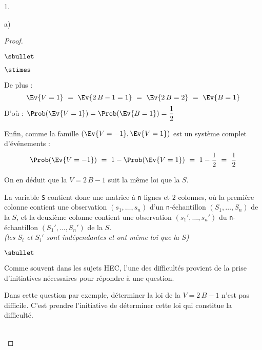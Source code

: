 \documentclass[11pt]{article}%
\begin{document}
\begin{noliste}{1.}
\begin{noliste}{a)}
\begin{proof}
\begin{noliste}{$\sbullet$}
\begin{noliste}{$\stimes$}
        \item De plus :
          \[
            \Ev{V = 1} \ = \ \Ev{2 \, B -1 = 1} \ = \ \Ev{2 \, B =
              2} \ = \ \Ev{B = 1}
          \]
          D'où : $\Prob(\Ev{V = 1}) = \Prob(\Ev{B = 1}) =
          \dfrac{1}{2}$
            
        \item Enfin, comme la famille $(\Ev{V = -1}, \Ev{V = 1})$
          est un système complet d'événements :
          \[
            \Prob(\Ev{V = -1}) \ = \ 1 - \Prob(\Ev{V = 1}) \ = \ 1 -
            \dfrac{1}{2} \ = \ \dfrac{1}{2}
          \]
        \end{noliste}
        On en déduit que la \var $V = 2 \, B -1$ suit la même loi que
        la \var $S$.
        
      \item La variable {\tt S} contient donc une
        matrice à {\tt n} lignes et $2$ colonnes, où
        la première colonne contient une observation
        $(s_1, \ldots, s_n)$ d'un
        {\tt n}-échantillon $(S_1, \ldots, S_n)$ de la \var $S$, et la
        deuxième colonne contient une observation $(s_1', \ldots,
        s_n')$ du {\tt n}-échantillon $(S_1', \ldots, S_n')$ de la
        \var $S$.\\
        {\it (les \var $S_i$ et $S_i'$ sont indépendantes et ont même
          loi que la \var $S$)}
      \end{noliste}
      \begin{remark}
        \begin{noliste}{$\sbullet$}
        \item Comme souvent dans les sujets HEC, l'une des difficultés
          provient de la prise d'initiatives nécessaires pour répondre à
          une question.
          
        \item Dans cette question par exemple, déterminer la loi de la
          \var $V = 2 \, B-1$ n'est pas difficile. C'est prendre
          l'initiative de déterminer cette loi qui constitue la difficulté.
        \end{noliste}
      \end{remark}~\\[-1.4cm]
    \end{proof}


    \newpage
    

\end{noliste}
\end{noliste}
\end{document}
